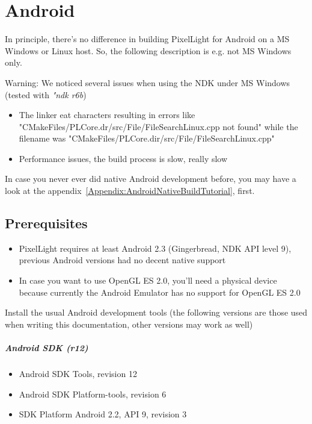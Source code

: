 \chapter{Android}
In principle, there's no difference in building PixelLight for Android on a \ac{MS} Windows or Linux host. So, the following description is e.g. not \ac{MS} Windows only.

Warning: We noticed several issues when using the \ac{NDK} under \ac{MS} Windows (tested with \emph{"ndk r6b})
\begin{itemize}
\item{The linker eat characters resulting in errors like "CMakeFiles/PLCore.dr/src/File/FileSearchLinux.cpp not found" while the filename was "CMakeFiles/PLCore.dir/src/File/FileSearchLinux.cpp"}
\item{Performance issues, the build process is slow, really slow}
\end{itemize}

In case you never ever did native Android development before, you may have a look at the appendix~\ref{Appendix:AndroidNativeBuildTutorial}, first.




\section{Prerequisites}
\begin{itemize}
\item{PixelLight requires at least Android 2.3 (Gingerbread, \ac{NDK} \ac{API} level 9), previous Android versions had no decent native support}
\item{In case you want to use OpenGL ES 2.0, you'll need a physical device because currently the Android Emulator has no support for OpenGL ES 2.0}
\end{itemize}

Install the usual Android development tools (the following versions are those used when writing this documentation, other versions may work as well)


\paragraph{Android \ac{SDK} (\emph{r12})}
\begin{itemize}
\item{Android \ac{SDK} Tools, revision 12}
\item{Android \ac{SDK} Platform-tools, revision 6}
\item{\ac{SDK} Platform Android 2.2, \ac{API} 9, revision 3}
\end{itemize}


